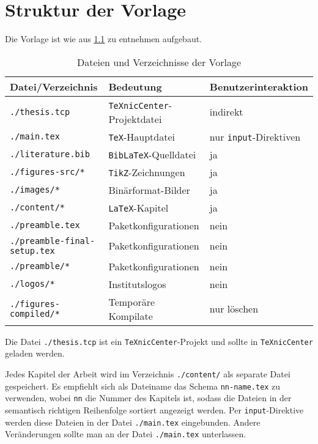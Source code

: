 \chapter{Struktur der Vorlage}

Die Vorlage ist wie aus \cref{tab:files-dirs-of-template} zu entnehmen aufgebaut.
\begin{table}[htbp]
\centering
\begin{tabular}{l l l} \toprule
\bfseries Datei/Verzeichnis        & \bfseries Bedeutung  & \bfseries Benutzerinteraktion \\ \midrule
\verb#./thesis.tcp#                & \texttt{TeXnicCenter}-Projektdatei  &  indirekt \\
\verb#./main.tex#                  & \texttt{TeX}-Hauptdatei  &  nur \texttt{input}-Direktiven \\
\verb#./literature.bib#            & \texttt{BibLaTeX}-Quelldatei  &  ja \\
\verb#./figures-src/*#             & \texttt {TikZ}-Zeichnungen  &  ja \\
\verb#./images/*#                  & Binärformat-Bilder  &  ja \\
\verb#./content/*#                 & \texttt{LaTeX}-Kapitel  &  ja \\
\verb#./preamble.tex#              & Paketkonfigurationen  &  nein \\
\verb#./preamble-final-setup.tex#  & Paketkonfigurationen  &  nein \\
\verb#./preamble/*#                & Paketkonfigurationen  &  nein \\
\verb#./logos/*#                   & Institutslogos  &  nein \\
\verb#./figures-compiled/*#        & Temporäre Kompilate  &  nur löschen \\
\bottomrule
\end{tabular}
\caption{Dateien und Verzeichnisse der Vorlage}
\label{tab:files-dirs-of-template}
\end{table}

Die Datei \texttt{./thesis.tcp} ist ein \texttt{TeXnicCenter}-Projekt und sollte
in \texttt{TeXnicCenter} geladen werden.

Jedes Kapitel der Arbeit wird im Verzeichnis \texttt{./content/}
als separate Datei gespeichert. Es empfiehlt sich als Dateiname das Schema
\texttt{nn-name.tex} zu verwenden, wobei \texttt{nn} die Nummer des Kapitels ist,
sodass die Dateien in der semantisch richtigen Reihenfolge sortiert angezeigt
werden. Per \texttt{input}-Direktive werden diese Dateien in der Datei \texttt{./main.tex}
eingebunden. Andere Veränderungen sollte man an der Datei \texttt{./main.tex}
unterlassen.

